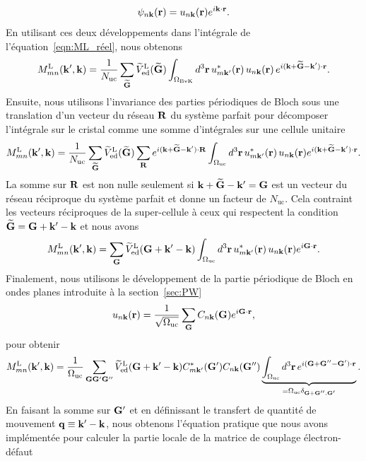 \begin{equation}
    \psi_{n\mathbf{k}}(\mathbf{r}) = u_{n\mathbf{k}}(\mathbf{r})e^{i\mathbf{k}\cdot\mathbf{r}}.
\end{equation}
En utilisant ces deux développements dans l'intégrale de l'équation~\eqref{eqn:ML_réel}, nous obtenons
\begin{equation}
    M^\text{L}_{mn}(\mathbf{k}',\mathbf{k}) = \frac{1}{N_\text{uc}}\sum_{\widetilde{\mathbf{G}}}\widetilde{V}_\text{ed}^\text{L}(\widetilde{\mathbf{G}})\int_{\Omega_\text{BvK}}d^3\mathbf{r}\,u^*_{m\mathbf{k}'}(\mathbf{r})\,u_{n\mathbf{k}}(\mathbf{r})\,e^{i(\mathbf{k}+\widetilde{\mathbf{G}}-\mathbf{k}')\cdot\mathbf{r}}.
\end{equation}
Ensuite, nous utilisons l'invariance des parties périodiques de Bloch sous une translation d'un vecteur du réseau $\mathbf{R}$ du système parfait pour décomposer l'intégrale sur le cristal comme une somme d'intégrales sur une cellule unitaire
\begin{equation}
    M^\text{L}_{mn}(\mathbf{k}',\mathbf{k}) = \frac{1}{N_\text{uc}}\sum_{\widetilde{\mathbf{G}}}\widetilde{V}_\text{ed}^\text{L}(\widetilde{\mathbf{G}})\sum_{\mathbf{R}} e^{i(\mathbf{k}+\widetilde{\mathbf{G}}-\mathbf{k}')\cdot\mathbf{R}}\int_{\Omega_\text{uc}} d^3\mathbf{r}\,u_{m\mathbf{k}'}^*(\mathbf{r})\,u_{n\mathbf{k}}(\mathbf{r})e^{i(\mathbf{k}+\widetilde{\mathbf{G}}-\mathbf{k}')\cdot\mathbf{r}}.
\end{equation}
La somme sur $\mathbf{R}$ est non nulle seulement si $\mathbf{k}+\widetilde{\mathbf{G}}-\mathbf{k}' = \mathbf{G}$ est un vecteur du réseau réciproque du système parfait et donne un facteur de $N_\text{uc}$. Cela contraint les vecteurs réciproques de la super-cellule à ceux qui respectent la condition $\widetilde{\mathbf{G}}=\mathbf{G}+\mathbf{k}'-\mathbf{k}$ et nous avons
\begin{equation}
    M^\text{L}_{mn}(\mathbf{k}',\mathbf{k}) = \sum_{\mathbf{G}}\widetilde{V}_\text{ed}^\text{L}(\mathbf{G}+\mathbf{k}'-\mathbf{k})\int_{\Omega_\text{uc}} d^3\mathbf{r}\,u_{m\mathbf{k}'}^*(\mathbf{r})\,u_{n\mathbf{k}}(\mathbf{r})e^{i\mathbf{G}\cdot\mathbf{r}}.
\end{equation}
Finalement, nous utilisons le développement de la partie périodique de Bloch en ondes planes introduite à la section~\ref{sec:PW}
\begin{equation}
    u_{n\mathbf{k}}(\mathbf{r}) = \frac{1}{\sqrt{\Omega_\text{uc}}}\sum_{\mathbf{G}} C_{n\mathbf{k}}(\mathbf{G})e^{i\mathbf{G}\cdot\mathbf{r}},
\end{equation}
pour obtenir
\begin{equation}
     M^\text{L}_{mn}(\mathbf{k}',\mathbf{k}) = \frac{1}{\Omega_\text{uc}}\sum_{\mathbf{G}\mathbf{G}'\mathbf{G}''}\widetilde{V}_\text{ed}^\text{L}(\mathbf{G}+\mathbf{k}'-\mathbf{k})C_{m\mathbf{k}'}^*(\mathbf{G}')C_{n\mathbf{k}}(\mathbf{G}'')\underbrace{\int_{\Omega_\text{uc}} d^3\mathbf{r}\,e^{i(\mathbf{G}+\mathbf{G}''-\mathbf{G}')\cdot\mathbf{r}}}_{=\Omega_\text{uc}\delta_{\mathbf{G}+\mathbf{G}'',\mathbf{G}'}}.
\end{equation}
En faisant la somme sur $\mathbf{G}'$ et en définissant le transfert de quantité de mouvement $\mathbf{q}\equiv\mathbf{k}'-\mathbf{k}$, nous obtenons l'équation pratique que nous avons implémentée pour calculer la partie locale de la matrice de couplage électron-défaut
